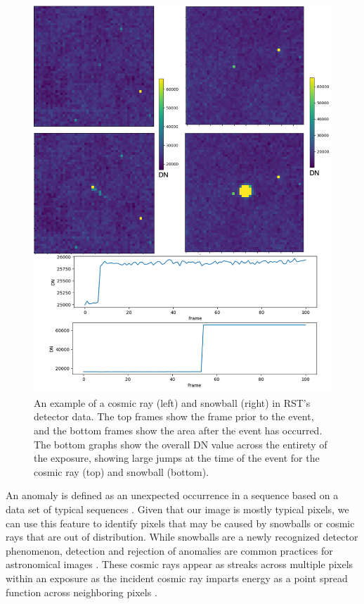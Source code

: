 \begin{figure}
    \centering
    \includegraphics[width=.75\linewidth]{figs/rst/Examples_fixed.png}
    \caption[An Example of a Cosmic Ray and a Snowball in WFI Detector Data]{An example of a cosmic ray (left) and snowball (right) in RST's detector data. The top frames show the frame prior to the event, and the bottom frames show the area after the event has occurred. The bottom graphs show the overall DN value across the entirety of the exposure, showing large jumps at the time of the event for the cosmic ray (top) and snowball (bottom).}
    \label{rst/fig:anomalies}
\end{figure}

An anomaly is defined as an unexpected occurrence in a sequence based on a data set of typical sequences \parencite{horton2021integrating}. 
Given that our image is mostly typical pixels, we can use this feature to identify pixels that may be caused by snowballs or cosmic rays that are out of distribution. 
While snowballs are a newly recognized detector phenomenon, detection and rejection of anomalies are common practices for astronomical images \parencite{van2001cosmic}.
These cosmic rays appear as streaks across multiple pixels within an exposure as the incident cosmic ray imparts energy as a point spread function across neighboring pixels \parencite{pych2003fast}.

